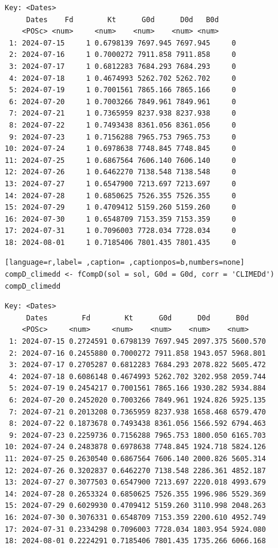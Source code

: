 \begin{itemize}
\begin{verbatim}
Key: <Dates>
	 Dates    Fd        Kt      G0d      D0d   B0d
	<POSc> <num>     <num>    <num>    <num> <num>
 1: 2024-07-15     1 0.6798139 7697.945 7697.945     0
 2: 2024-07-16     1 0.7000272 7911.858 7911.858     0
 3: 2024-07-17     1 0.6812283 7684.293 7684.293     0
 4: 2024-07-18     1 0.4674993 5262.702 5262.702     0
 5: 2024-07-19     1 0.7001561 7865.166 7865.166     0
 6: 2024-07-20     1 0.7003266 7849.961 7849.961     0
 7: 2024-07-21     1 0.7365959 8237.938 8237.938     0
 8: 2024-07-22     1 0.7493438 8361.056 8361.056     0
 9: 2024-07-23     1 0.7156288 7965.753 7965.753     0
10: 2024-07-24     1 0.6978638 7748.845 7748.845     0
11: 2024-07-25     1 0.6867564 7606.140 7606.140     0
12: 2024-07-26     1 0.6462270 7138.548 7138.548     0
13: 2024-07-27     1 0.6547900 7213.697 7213.697     0
14: 2024-07-28     1 0.6850625 7526.355 7526.355     0
15: 2024-07-29     1 0.4709412 5159.260 5159.260     0
16: 2024-07-30     1 0.6548709 7153.359 7153.359     0
17: 2024-07-31     1 0.7096003 7728.034 7728.034     0
18: 2024-08-01     1 0.7185406 7801.435 7801.435     0
\end{verbatim}

\begin{lstlisting}[language=r,label= ,caption= ,captionpos=b,numbers=none]
compD_climedd <- fCompD(sol = sol, G0d = G0d, corr = 'CLIMEDd')
compD_climedd
\end{lstlisting}

\begin{verbatim}
Key: <Dates>
	 Dates        Fd        Kt      G0d      D0d      B0d
	<POSc>     <num>     <num>    <num>    <num>    <num>
 1: 2024-07-15 0.2724591 0.6798139 7697.945 2097.375 5600.570
 2: 2024-07-16 0.2455880 0.7000272 7911.858 1943.057 5968.801
 3: 2024-07-17 0.2705287 0.6812283 7684.293 2078.822 5605.472
 4: 2024-07-18 0.6086148 0.4674993 5262.702 3202.958 2059.744
 5: 2024-07-19 0.2454217 0.7001561 7865.166 1930.282 5934.884
 6: 2024-07-20 0.2452020 0.7003266 7849.961 1924.826 5925.135
 7: 2024-07-21 0.2013208 0.7365959 8237.938 1658.468 6579.470
 8: 2024-07-22 0.1873678 0.7493438 8361.056 1566.592 6794.463
 9: 2024-07-23 0.2259736 0.7156288 7965.753 1800.050 6165.703
10: 2024-07-24 0.2483878 0.6978638 7748.845 1924.718 5824.126
11: 2024-07-25 0.2630540 0.6867564 7606.140 2000.826 5605.314
12: 2024-07-26 0.3202837 0.6462270 7138.548 2286.361 4852.187
13: 2024-07-27 0.3077503 0.6547900 7213.697 2220.018 4993.679
14: 2024-07-28 0.2653324 0.6850625 7526.355 1996.986 5529.369
15: 2024-07-29 0.6029930 0.4709412 5159.260 3110.998 2048.263
16: 2024-07-30 0.3076331 0.6548709 7153.359 2200.610 4952.749
17: 2024-07-31 0.2334298 0.7096003 7728.034 1803.954 5924.080
18: 2024-08-01 0.2224291 0.7185406 7801.435 1735.266 6066.168
\end{verbatim}


\end{itemize}
